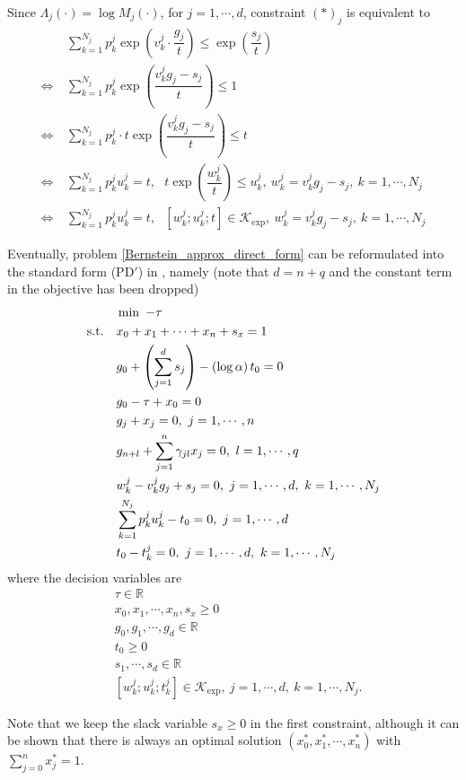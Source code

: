 \documentclass[11pt]{article}
\begin{document}
Since $\Lambda_j\left(\cdot\right) = \log M_j \left(\cdot\right)$, for $j=1, \cdots, d$, constraint $(*)_j$ is equivalent to 
\begin{align*}
&\sum_{k=1}^{N_j} p_k^j \exp \left(v_k^j \cdot \dfrac{g_j}{t}\right) \leq \exp\left(\dfrac{s_j}{t}\right) \\
\Leftrightarrow\ & \sum_{k=1}^{N_j} p_k^j \exp\left(\dfrac{v_k^j g_j - s_j}{t}\right) \leq 1 \\
\Leftrightarrow\ & \sum_{k=1}^{N_j} p_k^j\cdot  t \exp\left(\dfrac{v_k^j g_j - s_j}{t}\right) \leq t \\
\Leftrightarrow\ & \sum_{k=1}^{N_j} p_k^ju_k^j = t,\ \ \ t\exp\left(\dfrac{w_k^j}{t}\right) \leq u_k^j,\ w_k^j =v_k^j g_j - s_j,\ k = 1, \cdots, N_j \\
\Leftrightarrow\ & \sum_{k=1}^{N_j} p_k^ju_k^j = t,\ \ \ \left[w_k^j; u_k^j; t\right] \in \mathcal{K}_{\exp},\ w_k^j =v_k^j g_j - s_j,\ k = 1, \cdots, N_j
\end{align*}

Eventually, problem \eqref{Bernstein_approx_direct_form} can be reformulated into the standard form (PD$'$) in \cite{Gao_Yuan_thesis}, namely (note that $d = n+q$ and the constant term in the objective has been dropped)
\begin{align}
\begin{split}\label{reformulated_std_conic_form}
&\min \ -\tau \\ 
\textnormal{s.t.}\ \ \ & x_0 + x_1 + \cdots + x_n + s_x = 1 \\
& g_0 + \left(\sum_{j=1}^d s_j\right) - \left(\log \alpha\right) t_0 = 0 \\
& g_0  - \tau + x_0 = 0 \\
& g_j + x_j = 0,\ j = 1, \cdots, n \\
& g_{n+l} + \sum_{j=1}^n \gamma_{jl} x_j = 0,\ l = 1, \cdots, q \\
& w_k^j - v_k^j g_j + s_j = 0,\ j = 1, \cdots,d,\ k = 1, \cdots, N_j \\
& \sum_{k=1}^{N_j} p_k^j u_k^j - t_0 = 0,\  j =1,\cdots,d \\
& t_0 - t_k^j = 0,\ j = 1,\cdots, d,\ k = 1,\cdots,N_j
\end{split}
\end{align}
where the decision variables are
\begin{align*}
& \tau \in \mathbb{R} \\
& x_0, x_1, \cdots, x_n, s_x \geq 0 \\
& g_0, g_1, \cdots, g_d \in \mathbb{R} \\
& t_0 \geq 0 \\
& s_1, \cdots, s_d \in \mathbb{R} \\
& [w_k^j; u_k^j; t_k^j] \in \mathcal{K}_{\exp},\ j = 1, \cdots, d,\ k = 1,\cdots, N_j.
\end{align*}

Note that we keep the slack variable $s_x \geq 0$ in the first constraint, although it can be shown that there is always an optimal solution $(x_0^*, x_1^*, \cdots, x_n^*)$ with $\sum_{j=0}^n x_j^* = 1$.

{}

\end{document}
